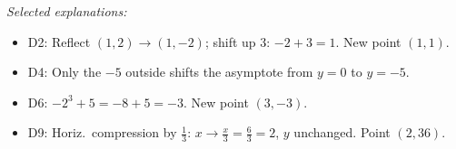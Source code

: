 \documentclass[12pt]{article}
\begin{document}
\vspace{0.5em}
\noindent\textit{Selected explanations:}
\begin{itemize}[itemsep=2pt]
\item D2: Reflect $(1,2)\to(1,-2)$; shift up 3: $-2+3=1$. New point $(1,1)$.
\item D4: Only the $-5$ outside shifts the asymptote from $y=0$ to $y=-5$.
\item D6: $-2^3+5=-8+5=-3$. New point $(3,-3)$.
\item D9: Horiz.\ compression by $\tfrac{1}{3}$: $x\to\tfrac{x}{3}=\tfrac{6}{3}=2$, $y$ unchanged. Point $(2,36)$.
\end{itemize}
\end{document}
